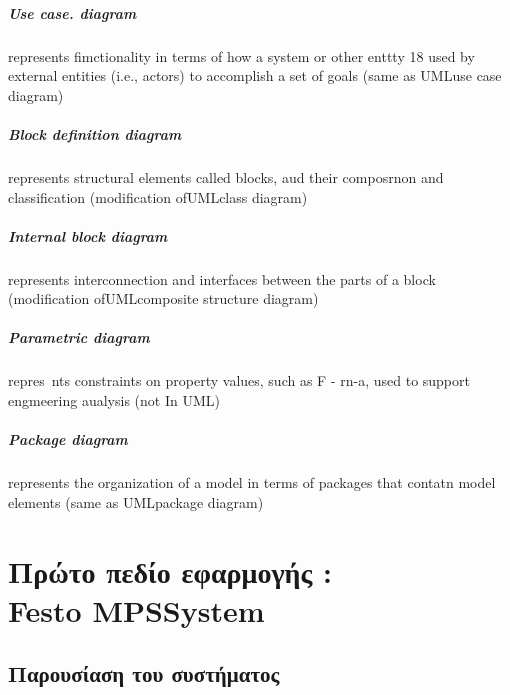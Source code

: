\documentclass[a4paper,12pt,twoside]{report}
\begin{document}
{			\paragraph{Use case. diagram} {represents fimctionality in terms of how a system or other enttty 18 used by external entities (i.e., actors) to accomplish a set of goals (same as UMLuse case diagram)
			}
			\paragraph{Block definition diagram} {represents structural elements called blocks, aud their composrnon and classification (modification ofUMLclass diagram)
			}
			\paragraph{Internal block diagram} {represents interconnection and interfaces between the parts of a block (modification ofUMLcomposite structure diagram)
			}
			\paragraph{Parametric diagram} {repres~nts constraints on property values, such as F - rn-a, used to support engmeering aualysis
			(not In UML)
			}
			\paragraph{Package diagram} {represents the organization of a model in terms of packages that contatn model elements (same as UMLpackage diagram)
			}
		
		
	\chapter{Πρώτο πεδίο εφαρμογής :\\ Festo MPS\textregistered  System}
		\label{κεφ.:Πρώτο πεδίο εφαρμογής : MPS System}

		\section{Παρουσίαση του συστήματος}
		
}
\end{document}
